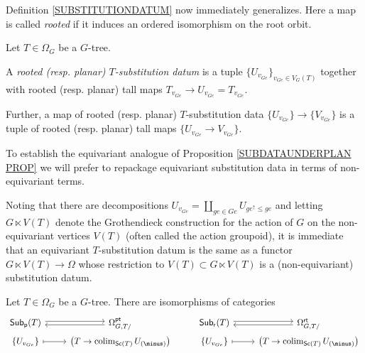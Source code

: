 \documentclass[a4paper,10pt]{article}%
\begin{document}
Definition \ref{SUBSTITUTIONDATUM} now immediately generalizes. Here a map is called \textit{rooted} if it induces an ordered isomorphism on the root orbit.


\begin{definition}\label{SUBSTITUTIONDATUMG DEF}
	Let $T \in \Omega_G$ be a $G$-tree.
	
	A \textit{rooted (resp. planar) $T$-substitution datum} is a tuple 
	$\{U_{v_{G e}}\}_{v_{G e} \in V_G(T)}$ together with rooted (resp. planar) tall maps 
	$T_{v_{Ge}} \to U_{v_{G e}} = T_{v_{G e}}$.
	
	Further, a map of rooted (resp. planar) $T$-substitution data 
	$\{U_{v_{G e}}\} \to \{V_{v_{G e}}\}$ is a tuple of rooted (resp. planar) tall maps $\{U_{v_{G e}} \to V_{v_{G e}}\}$.
\end{definition}

\begin{remark}\label{SUBSDATUMCONV REM}
	To establish the equivariant analogue of Proposition \ref{SUBDATAUNDERPLAN PROP} we will prefer to repackage equivariant substitution data in terms of non-equivariant terms.

Noting that there are decompositions 
$U_{v_{G e}}= \coprod_{g e \in Ge} U_{ge^{\uparrow} \leq ge}$
and letting $G \ltimes V(T)$ denote the Grothendieck construction for the action of $G$ on the non-equivariant vertices $V(T)$ (often called the action groupoid), it is immediate that an equivariant $T$-substitution datum is the same as a functor $G \ltimes V(T) \to \Omega$ whose restriction to $V(T) \subset G \ltimes V(T)$ is a (non-equivariant) substitution datum.
\end{remark}


\begin{proposition}\label{SUBDATAUNDERPLANG PROP}
Let $T \in \Omega_G$ be a $G$-tree. There are isomorphisms of categories
\begin{equation}\label{SUBDATAUNDERPLANG EQ}
\begin{tikzcd}[row sep =0pt]
	\mathsf{Sub}_{\mathsf{p}}(T) \ar[r,shift left=2pt] &
	\Omega_{G,T/}^{\mathsf{pt}} \ar[l,shift left=2pt] &
	\mathsf{Sub}_{\mathsf{r}}(T) \ar[r,shift left=2pt] &
	\Omega_{G,T/}^{\mathsf{rt}} \ar[l,shift left=2pt]
\\
	\{U_{v_{G e}}\} \ar[r,mapsto] & 
	\left(T \to \colim_{\mathsf{Sc}(T)} U_{(\minus)}\right) &
	\{U_{v_{G e}}\} \ar[r,mapsto] & 
	\left(T \to \colim_{\mathsf{Sc}(T)} U_{(\minus)}\right)
\end{tikzcd}
\end{equation}
\end{proposition}
\end{document}
